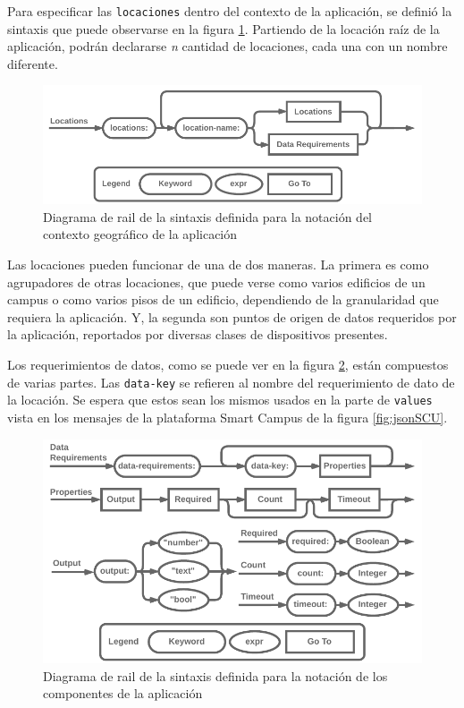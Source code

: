 Para especificar las \texttt{locaciones} dentro del contexto de la aplicación, se definió la sintaxis que puede observarse en la figura \ref{fig:rail-location}. Partiendo de la locación raíz de la aplicación, podrán declararse \textit{n} cantidad de locaciones, cada una con un nombre diferente.

\begin{figure}[H]
    \centering
    \caption{Diagrama de rail de la sintaxis definida para la notación del contexto geográfico de la aplicación}
    \label{fig:rail-location}
    \vspace{-2mm}
    \includegraphics[width=\linewidth]{images/Railroad Locations Alt.pdf}
\end{figure}

Las locaciones pueden funcionar de una de dos maneras. La primera es como agrupadores de otras locaciones, que puede verse como varios edificios de un campus o como varios pisos de un edificio, dependiendo de la granularidad que requiera la aplicación. Y, la segunda son puntos de origen de datos requeridos por la aplicación, reportados por diversas clases de dispositivos presentes.

Los requerimientos de datos, como se puede ver en la figura \ref{fig:rail-data-req}, están compuestos de varias partes. Las \texttt{data-key} se refieren al nombre del requerimiento de dato de la locación. Se espera que estos sean los mismos usados en la parte de \texttt{values} vista en los mensajes de la plataforma Smart Campus de la figura \ref{fig:jsonSCU}.

\begin{figure}[H]
    \centering
    \caption{Diagrama de rail de la sintaxis definida para la notación de los componentes de la aplicación}
    \label{fig:rail-data-req}
    \vspace{-2mm}
    \includegraphics[width=\linewidth]{images/Railroad Data Requirements.pdf}
\end{figure}

